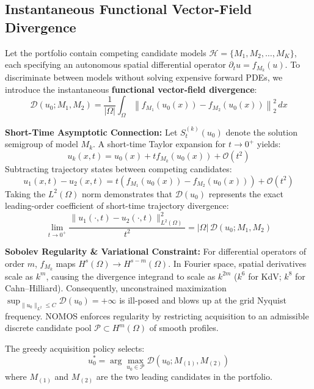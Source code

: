 \documentclass[twocolumn,10pt,a4paper]{article}
\begin{document}
\subsection{Instantaneous Functional Vector-Field Divergence}
Let the portfolio contain competing candidate models $\mathcal{H} = \{M_1, M_2, \dots, M_K\}$, each specifying an autonomous spatial differential operator $\partial_t u = f_{M_k}(u)$. To discriminate between models without solving expensive forward PDEs, we introduce the instantaneous \textbf{functional vector-field divergence}:
\begin{equation}
\mathcal{D}(u_0; M_1, M_2) = \frac{1}{|\Omega|} \int_{\Omega} \left\| f_{M_1}(u_0(x)) - f_{M_2}(u_0(x)) \right\|_2^2 \, dx
\label{eq:divergence}
\end{equation}

\textbf{Short-Time Asymptotic Connection:} Let $S_t^{(k)}(u_0)$ denote the solution semigroup of model $M_k$. A short-time Taylor expansion for $t \to 0^+$ yields:
\begin{equation}
u_k(x, t) = u_0(x) + t f_{M_k}(u_0(x)) + \mathcal{O}(t^2)
\end{equation}
Subtracting trajectory states between competing candidates:
\begin{equation}
u_1(x, t) - u_2(x, t) = t \left( f_{M_1}(u_0(x)) - f_{M_2}(u_0(x)) \right) + \mathcal{O}(t^2)
\end{equation}
Taking the $L^2(\Omega)$ norm demonstrates that $\mathcal{D}(u_0)$ represents the exact leading-order coefficient of short-time trajectory divergence:
\begin{equation}
\lim_{t \to 0^+} \frac{\|u_1(\cdot, t) - u_2(\cdot, t)\|_{L^2(\Omega)}^2}{t^2} = |\Omega| \, \mathcal{D}(u_0; M_1, M_2)
\end{equation}

\textbf{Sobolev Regularity \& Variational Constraint:} For differential operators of order $m$, $f_{M_k}$ maps $H^s(\Omega) \to H^{s-m}(\Omega)$. In Fourier space, spatial derivatives scale as $k^m$, causing the divergence integrand to scale as $k^{2m}$ ($k^6$ for KdV; $k^8$ for Cahn--Hilliard). Consequently, unconstrained maximization $\sup_{\|u_0\|_{L^2} \le C} \mathcal{D}(u_0) = +\infty$ is ill-posed and blows up at the grid Nyquist frequency. NOMOS enforces regularity by restricting acquisition to an admissible discrete candidate pool $\mathcal{P} \subset H^m(\Omega)$ of smooth profiles.

The greedy acquisition policy selects:
\begin{equation}
u_0^* = \arg\max_{u_0 \in \mathcal{P}} \mathcal{D}(u_0; M_{(1)}, M_{(2)})
\end{equation}
where $M_{(1)}$ and $M_{(2)}$ are the two leading candidates in the portfolio.
\end{document}
